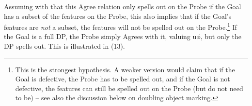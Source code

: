 \documentclass[output=paper
,modfonts
,nonflat]{langsci/langscibook}
\begin{document}
\begin{exe}
	\ex 
	\xlist
	\endxlist
\end{exe}
Assuming with \citet{Roberts2010} that this Agree relation only spells out on the Probe if the Goal has a subset of the features on the Probe, this also implies that if the Goal’s features are \textit{not} a subset, the features will not be spelled out on the Probe.\footnote{This is the strongest hypothesis. A weaker version would claim that if the Goal is defective, the Probe has to be spelled out, and if the Goal is not defective, the features can still be spelled out on the Probe (but do not need to be) – see also the discussion below on doubling object marking.} If the Goal is a full DP, the Probe simply Agrees with it, valuing u$\phi$, but only the DP spells out. This is illustrated in (13).
\end{document}
